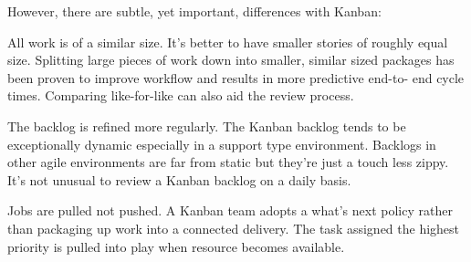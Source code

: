 However,
there are subtle, yet important, differences with Kanban:

All work is of a similar size. It's better to have smaller
stories of roughly equal size. Splitting large pieces of work
down into smaller, similar sized packages has been proven
to improve workflow and results in more predictive end-to-
end cycle times. Comparing like-for-like can also aid the
review process.

The backlog is refined more regularly. The Kanban
backlog tends to be exceptionally dynamic especially
in a support type environment. Backlogs in other agile
environments are far from static but they're just a touch
less zippy. It's not unusual to review a Kanban backlog on a
daily basis.

Jobs are pulled not pushed. A Kanban team adopts a
what's next policy rather than packaging up work into a
connected delivery. The task assigned the highest priority is
pulled into play when resource becomes available.


